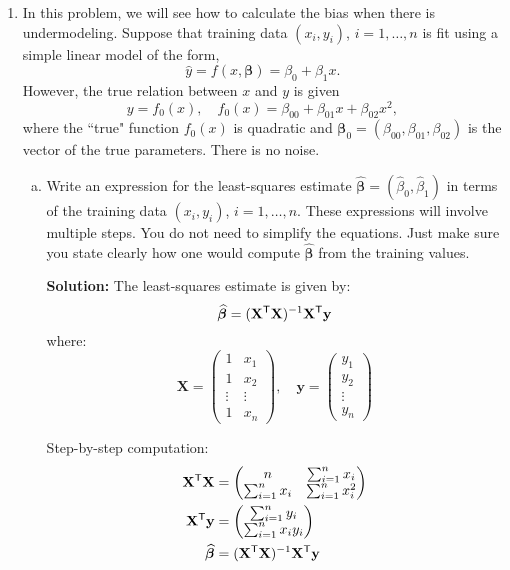 \documentclass[11pt]{article}
\newcommand{\ybf}{\mathbf{y}}
\newcommand{\Xbf}{\mathbf{X}}
\def\betahat{\widehat{\beta}}
\def\betabf{{\boldsymbol \beta}}
\def\betabfhat{{\widehat{\bm{\beta}}}}
\newcommand{\tran}{^{\text{\sf T}}}
\begin{document}
\begin{enumerate}
\begin{enumerate}[(a)]
\end{enumerate}


\item In this problem, we will see how to calculate the bias when
there is undermodeling.  Suppose that training data $(x_i,y_i)$, $i=1,\ldots,n$
is fit using a simple linear model of the form,
\[
    \hat{y} = f(x,\betabf) = \beta_0 + \beta_1 x.
\]
However, the true relation between $x$ and $y$ is given
\[
    y = f_0(x), \quad f_0(x)=\beta_{00} + \beta_{01}x + \beta_{02} x^2,
\]
where the ``true" function $f_0(x)$ is quadratic and
$\betabf_0=(\beta_{00},\beta_{01},\beta_{02})$ is the vector of the true parameters. There is no noise.
\begin{enumerate}[(a)]
\item Write an expression
for the least-squares estimate $\betabfhat = (\betahat_0,\betahat_1)$ in terms of the training data
$(x_i,y_i)$, $i=1,\ldots,n$.
These expressions will  involve multiple steps.
You do not need to simplify the equations.
Just make sure you state clearly how one would compute $\betabfhat$ from the training values.

\textbf{Solution:}
The least-squares estimate is given by:
\[
\betabfhat = (\Xbf\tran\Xbf)^{-1}\Xbf\tran\ybf
\]
where:
\[
\Xbf = \begin{pmatrix}
1 & x_1 \\
1 & x_2 \\
\vdots & \vdots \\
1 & x_n
\end{pmatrix}, \quad \ybf = \begin{pmatrix}
y_1 \\
y_2 \\
\vdots \\
y_n
\end{pmatrix}
\]

Step-by-step computation:
\begin{align}
\Xbf\tran\Xbf &= \begin{pmatrix} n & \sum_{i=1}^n x_i \\ \sum_{i=1}^n x_i & \sum_{i=1}^n x_i^2 \end{pmatrix} \\
\Xbf\tran\ybf &= \begin{pmatrix} \sum_{i=1}^n y_i \\ \sum_{i=1}^n x_i y_i \end{pmatrix} \\
\betabfhat &= (\Xbf\tran\Xbf)^{-1}\Xbf\tran\ybf
\end{align}


\end{enumerate}
\end{enumerate}
\end{document}
